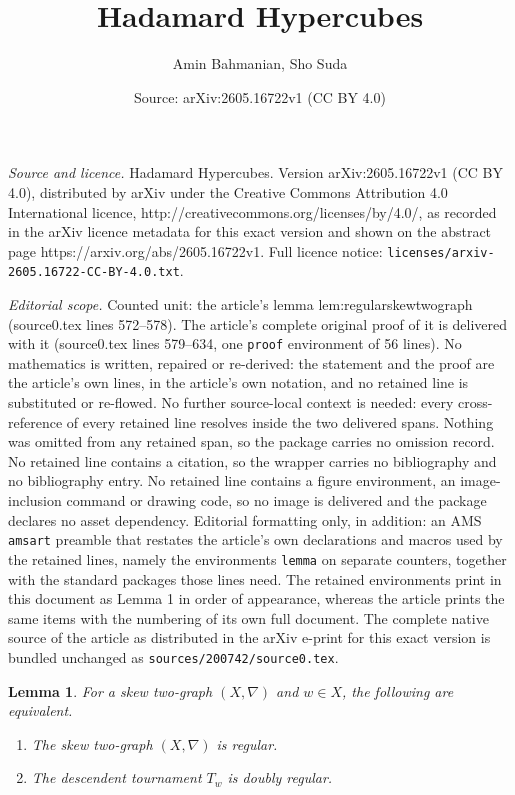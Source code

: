 \documentclass[10pt,a4paper]{amsart}
\title{Hadamard Hypercubes}
\author{Amin Bahmanian, Sho Suda}
\date{Source: arXiv:2605.16722v1 (CC BY 4.0)}
\newtheorem{lemma}{Lemma}
\begin{document}
\maketitle

\noindent\emph{Source and licence.} Hadamard Hypercubes. Version arXiv:2605.16722v1 (CC BY 4.0), distributed by arXiv under the Creative Commons Attribution 4.0 International licence, http://creativecommons.org/licenses/by/4.0/, as recorded in the arXiv licence metadata for this exact version and shown on the abstract page https://arxiv.org/abs/2605.16722v1. Full licence notice: \texttt{licenses/arxiv-2605.16722-CC-BY-4.0.txt}.\par\smallskip

\noindent\textit{Editorial scope.} Counted unit: the article's lemma lem:regularskewtwograph (source0.tex lines 572--578). The article's complete original proof of it is delivered with it (source0.tex lines 579--634, one \texttt{proof} environment of 56 lines). No mathematics is written, repaired or re-derived: the statement and the proof are the article's own lines, in the article's own notation, and no retained line is substituted or re-flowed.  No further source-local context is needed: every cross-reference of every retained line resolves inside the two delivered spans.  Nothing was omitted from any retained span, so the package carries no omission record.  No retained line contains a citation, so the wrapper carries no bibliography and no bibliography entry.  No retained line contains a figure environment, an image-inclusion command or drawing code, so no image is delivered and the package declares no asset dependency.  Editorial formatting only, in addition: an AMS \texttt{amsart} preamble that restates the article's own declarations and macros used by the retained lines, namely the environments \texttt{lemma} on separate counters, together with the standard packages those lines need.  The retained environments print in this document as Lemma 1 in order of appearance, whereas the article prints the same items with the numbering of its own full document.  The complete native source of the article as distributed in the arXiv e-print for this exact version is bundled unchanged as \texttt{sources/200742/source0.tex}.
\begin{lemma}\label{lem:regularskewtwograph} 
For a skew two-graph $(X,\nabla)$  and  $w\in X$,  the following are equivalent. 
    \begin{enumerate}
        \item [\textup{(i)}] The skew two-graph $(X,\nabla)$ is  regular. 
        \item [\textup{(ii)}] The descendent tournament $T_w$ is doubly regular. 
    \end{enumerate}
\end{lemma}
\end{document}
